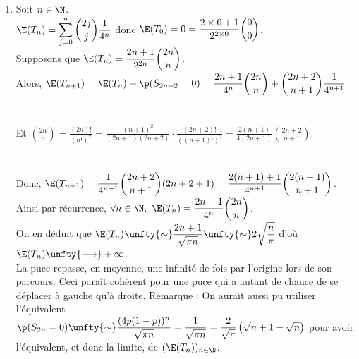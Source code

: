 \documentclass[8pt]{book}
\begin{document}
\begin{enumerate}
		$\displaystyle\binom{-1/2}{n}=\frac{1}{n!}\prod\limits_{k=0}^{n-1}\left(-\frac{1}{2}-k\right)=\frac{(-1)^n}{2^nn!}\prod\limits_{k=0}^{n-1}(2k+1)=\frac{(-1)^n}{2^nn!}\cdot\frac{\displaystyle\prod\limits_{k=1}^{2n}k}{\displaystyle\prod\limits_{k=1}^n2k}=\frac{(-1)^n(2n)!}{2^{2n}(n!)^2}=\frac{(-1)^n}{4^n}\binom{2n}{n}$.\\
		Donc $\displaystyle\frac{1}{\displaystyle\sqrt{1-x}}=\sum\limits_{n=0}^{+\infty}\binom{2n}{n}\left(\frac{x}{4}\right)^n$.\\
		$p\ne \displaystyle\frac{1}{2}\implies 0<4p(1-p)<1$ donc,\\
		$\unfty{\lim}\E(T_n)=\displaystyle\sum\limits_{n=0}^{+\infty}\binom{2n}{n}\left(\frac{4p(1-p)}{4}\right)^n=\frac{1}{\displaystyle\sqrt{1-4p(1-p)}}$.\\
		On peut interpréter qu'en moyenne, la puce est repassée $\displaystyle\frac{1}{\displaystyle\sqrt{1-4p(1-p)}}$ fois par l'origine lors de son parcours.
		\item Soit $n\in \N$.\\
		$\E(T_n)=\displaystyle\sum\limits_{j=0}^{n}\binom{2j}{j}\displaystyle\frac{1}{4^n}$ donc $\E(T_0)=0=\displaystyle\frac{2\times 0+1}{2^{2\times 0}}\binom{0}{0}$.\\
		Supposons que $\E(T_n)=\displaystyle\frac{2n+1}{2^{2n}}\binom{2n}{n}$.\\
		Alors, $\E(T_{n+1})=\E(T_n)+\p(S_{2n+2}=0)=\displaystyle\frac{2n+1}{4^n}\binom{2n}{n}+\binom{2n+2}{n+1}\frac{1}{4^{n+1}}$\\\\\\
		Et $\displaystyle\binom{2n}{n}=\frac{(2n)!}{(n!)^2}=\frac{(n+1)^2}{(2n+1)(2n+2)}\cdot \frac{(2n+2)!}{((n+1)!)^2}=\frac{2(n+1)}{4(2n+1)}\binom{2n+2}{n+1}$.\\\\\\
		Donc, $\E(T_{n+1})=\displaystyle\frac{1}{4^{n+1}}\binom{2n+2}{n+1}(2n+2+1)=\frac{2(n+1)+1}{4^{n+1}}\binom{2(n+1)}{n+1}$.\\
		Ainsi par récurrence, $\forall n\in \N,\ \E(T_n)=\displaystyle\frac{2n+1}{4^n}\binom{2n}{n}$.\\
		On en déduit que $\E(T_n)\unfty{\sim}\displaystyle\frac{2n+1}{\displaystyle\sqrt{\pi n}}\unfty{\sim}2\displaystyle\sqrt{\frac{n}{\pi}}$ d'où $\E(T_n)\unfty{\longrightarrow}+\infty$.\\
		La puce repasse, en moyenne, une infinité de fois par l'origine lors de son parcours. Ceci paraît cohérent pour une puce qui a autant de chance de se déplacer à gauche qu'à droite.
		\underline{Remarque :} On aurait aussi pu utiliser l'équivalent $\p(S_{2n}=0)\unfty{\sim}\displaystyle\frac{(4p(1-p))^n}{\displaystyle\sqrt{\pi n}}=\frac{1}{\displaystyle\sqrt{\pi n}}=\frac{2}{\displaystyle\sqrt{\pi}}\left(\displaystyle\sqrt{n+1}-\displaystyle\sqrt{n}\right)$ pour avoir l'équivalent, et donc la limite, de $(\E(T_n))_{n\in \N}$.
	\end{enumerate}
	
\end{document}
